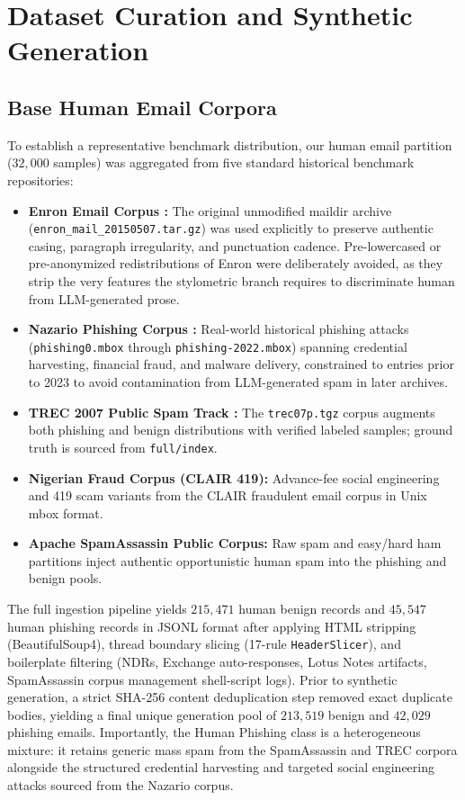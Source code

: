 \documentclass[journal]{IEEEtran}
\begin{document}
\section{Dataset Curation and Synthetic Generation}
\label{sec:dataset}

\subsection{Base Human Email Corpora}
To establish a representative benchmark distribution, our human email partition ($32{,}000$ samples) was aggregated from five standard historical benchmark repositories:
\begin{itemize}
    \item \textbf{Enron Email Corpus \cite{klimt2004enron}:} The original unmodified maildir archive (\texttt{enron\_mail\_20150507.tar.gz}) was used explicitly to preserve authentic casing, paragraph irregularity, and punctuation cadence. Pre-lowercased or pre-anonymized redistributions of Enron were deliberately avoided, as they strip the very features the stylometric branch requires to discriminate human from LLM-generated prose.
    \item \textbf{Nazario Phishing Corpus \cite{nazario2005phishing}:} Real-world historical phishing attacks (\texttt{phishing0.mbox} through \texttt{phishing-2022.mbox}) spanning credential harvesting, financial fraud, and malware delivery, constrained to entries prior to 2023 to avoid contamination from LLM-generated spam in later archives.
    \item \textbf{TREC 2007 Public Spam Track \cite{cormack2007trec}:} The \texttt{trec07p.tgz} corpus augments both phishing and benign distributions with verified labeled samples; ground truth is sourced from \texttt{full/index}.
    \item \textbf{Nigerian Fraud Corpus (CLAIR 419):} Advance-fee social engineering and 419 scam variants from the CLAIR fraudulent email corpus in Unix mbox format.
    \item \textbf{Apache SpamAssassin Public Corpus:} Raw spam and easy/hard ham partitions inject authentic opportunistic human spam into the phishing and benign pools.
\end{itemize}

The full ingestion pipeline yields $215{,}471$ human benign records and $45{,}547$ human phishing records in JSONL format after applying HTML stripping (BeautifulSoup4), thread boundary slicing (17-rule \texttt{HeaderSlicer}), and boilerplate filtering (NDRs, Exchange auto-responses, Lotus Notes artifacts, SpamAssassin corpus management shell-script logs). Prior to synthetic generation, a strict SHA-256 content deduplication step removed exact duplicate bodies, yielding a final unique generation pool of $213{,}519$ benign and $42{,}029$ phishing emails. Importantly, the Human Phishing class is a heterogeneous mixture: it retains generic mass spam from the SpamAssassin and TREC corpora alongside the structured credential harvesting and targeted social engineering attacks sourced from the Nazario corpus.
\end{document}
